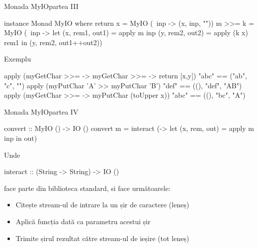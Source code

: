 \documentclass[xcolor=pdftex,romanian,colorlinks]{beamer}
\begin{document}
\begin{frame}[fragile]{Monada MyIO}{partea III}
\begin{asciihs}
   instance Monad MyIO where
     return x = MyIO (\ inp -> (x, inp, ""))
     m >>= k  = MyIO (\ inp ->
                    let (x, rem1, out1) = apply m inp
                        (y, rem2, out2) = apply (k x) rem1 
                      in
                        (y, rem2, out1++out2))
\end{asciihs}

\begin{block}
{Exemplu}
\vspace{-2ex}
\begin{asciihs}
   apply
     (myGetChar >>= \x -> myGetChar >>= \y -> return [x,y])
     "abc"
   == ("ab", "c", "")
   apply (myPutChar 'A' >> myPutChar 'B') "def"
   == ((), "def", "AB")
   apply (myGetChar >>= \x -> myPutChar (toUpper x)) "abc"
   == ((), "bc", "A")
\end{asciihs}
\end{block}

\end{frame}


%

\begin{frame}[fragile]{Monada MyIO}{partea IV}
\begin{asciihs}
   convert :: MyIO () -> IO ()
   convert m = interact (\inp ->
                   let (x, rem, out) = apply m inp in
                   out)
\end{asciihs}

Unde
\begin{asciihs}
   interact :: (String -> String) -> IO ()
\end{asciihs}
face parte din biblioteca standard, si face următoarele:
\begin{itemize}
\item Citește stream-ul de intrare la un șir de caractere (leneș)
\item Aplică funcția dată ca parametru acestui șir
\item Trimite șirul rezultat către stream-ul de ieșire (tot leneș)
\end{itemize}
\end{frame}


%
%
\end{document}
